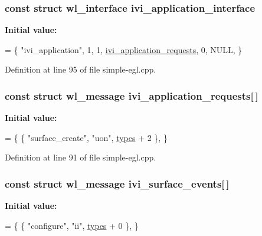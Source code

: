 \subsubsection[{\texorpdfstring{ivi\+\_\+application\+\_\+interface}{ivi_application_interface}}]{\setlength{\rightskip}{0pt plus 5cm}const struct wl\+\_\+interface ivi\+\_\+application\+\_\+interface}\hypertarget{simple-egl_8cpp_a769b65b7b0e834f732f1f45e835890d5}{}\label{simple-egl_8cpp_a769b65b7b0e834f732f1f45e835890d5}
{\bfseries Initial value\+:}
\begin{DoxyCode}
= \{
    \textcolor{stringliteral}{"ivi\_application"}, 1,
    1, \hyperlink{simple-egl_8cpp_a21a39b7c6cf5f6d10a62a70b3ebc9bad}{ivi\_application\_requests},
    0, NULL,
\}
\end{DoxyCode}


Definition at line 95 of file simple-\/egl.\+cpp.

\subsubsection[{\texorpdfstring{ivi\+\_\+application\+\_\+requests}{ivi_application_requests}}]{\setlength{\rightskip}{0pt plus 5cm}const struct wl\+\_\+message ivi\+\_\+application\+\_\+requests\mbox{[}$\,$\mbox{]}\hspace{0.3cm}{\ttfamily [static]}}\hypertarget{simple-egl_8cpp_a21a39b7c6cf5f6d10a62a70b3ebc9bad}{}\label{simple-egl_8cpp_a21a39b7c6cf5f6d10a62a70b3ebc9bad}
{\bfseries Initial value\+:}
\begin{DoxyCode}
= \{
        \{ \textcolor{stringliteral}{"surface\_create"}, \textcolor{stringliteral}{"uon"}, \hyperlink{simple-egl_8cpp_aea3203db9e218d3e5d60bdb4ebe2fa1f}{types} + 2 \},
\}
\end{DoxyCode}


Definition at line 91 of file simple-\/egl.\+cpp.

\subsubsection[{\texorpdfstring{ivi\+\_\+surface\+\_\+events}{ivi_surface_events}}]{\setlength{\rightskip}{0pt plus 5cm}const struct wl\+\_\+message ivi\+\_\+surface\+\_\+events\mbox{[}$\,$\mbox{]}\hspace{0.3cm}{\ttfamily [static]}}\hypertarget{simple-egl_8cpp_ac848f4fbf712a9ba414272fa85577791}{}\label{simple-egl_8cpp_ac848f4fbf712a9ba414272fa85577791}
{\bfseries Initial value\+:}
\begin{DoxyCode}
= \{
        \{ \textcolor{stringliteral}{"configure"}, \textcolor{stringliteral}{"ii"}, \hyperlink{simple-egl_8cpp_aea3203db9e218d3e5d60bdb4ebe2fa1f}{types} + 0 \},
\}
\end{DoxyCode}


